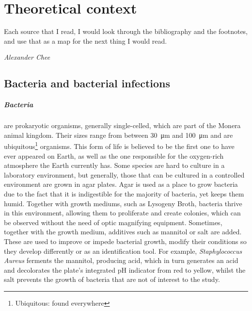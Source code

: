 \chapter{Theoretical context}
\epigraph{Each source that I read, I would look through the bibliography and the footnotes, and use that as a map for the next thing I would read.}{\textit{Alexander Chee}}
\section{Bacteria and bacterial infections}
\paragraph{Bacteria} are prokaryotic organisms, generally single-celled, which are part of the Monera animal kingdom. Their sizes range from between \SI{30}{\micro\metre} and \SI{100}{\micro\metre} and are ubiquitous\footnote{Ubiquitous: found everywhere} organisms. This form of life is believed to be the first one to have ever appeared on Earth, as well as the one responsible for the oxygen-rich atmosphere the Earth currently has. Some species are hard to culture in a laboratory environment, but generally, those that can be cultured in a controlled environment are grown in agar plates\cite{murrayMicrobiologiaMedica2013}. \newline
Agar is used as a place to grow bacteria due to the fact that it is indigestible for the majority of bacteria, yet keeps them humid. Together with growth mediums, such as Lysogeny Broth, bacteria thrive in this environment, allowing them to proliferate and create colonies, which can be observed without the need of optic magnifying equipment. Sometimes, together with the growth medium, additives such as mannitol or salt are added. These are used to improve or impede bacterial growth, modify their conditions so they develop differently or as an identification tool. For example, \emph{Staphylococcus Aureus} ferments the mannitol, producing acid, which in turn generates an acid and decolorates the plate's integrated pH indicator from red to yellow, whilst the salt prevents the growth of bacteria that are not of interest to the study\cite{gamazoManualPracticoMicrobiologia2010}.
